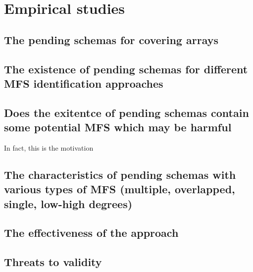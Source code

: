 {%



\section{Empirical studies}\label{sec:emp}


\subsection{The pending schemas for covering arrays}

%

\subsection{The existence of pending schemas for different MFS identification approaches}

%

\subsection{Does the exitentce of pending schemas contain some potential MFS which may be harmful}
In fact, this is the motivation


\subsection{The characteristics of pending schemas with various types of MFS (multiple, overlapped, single, low-high degrees)}



\subsection{The effectiveness of the approach}



\subsection{Threats to validity}


}
